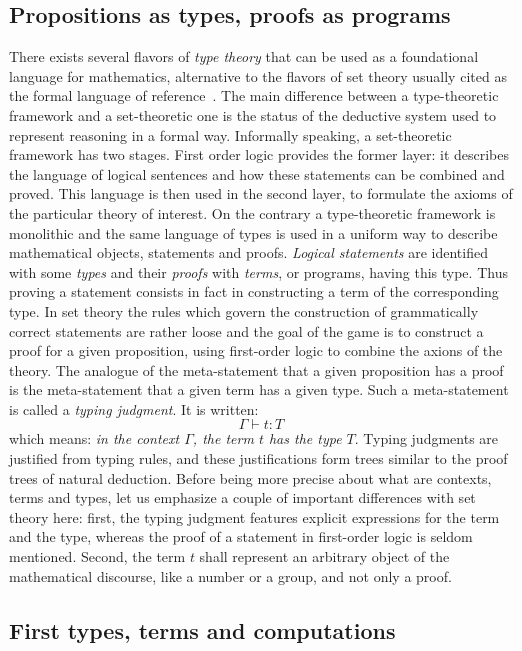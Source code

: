 \subsection{Propositions as types, proofs as programs}
There exists several flavors of \emph{type theory} that can be used
as a foundational language for mathematics, alternative to the
flavors of set theory usually cited as the formal language of
reference~\cite{MR2102219}.
The main difference between a type-theoretic framework and
a set-theoretic one is the status of the deductive system used to
represent reasoning in a formal way. Informally speaking, a
set-theoretic framework has two stages. First order logic provides
the former layer: it describes the language of logical sentences and how
these statements can be combined and proved. This language is then
used in the second layer, to formulate the axioms of the particular
theory of interest. 
On the contrary a type-theoretic framework is monolithic and the
same language of types is used in a uniform way to describe
mathematical objects, statements and proofs. \emph{Logical statements}
are identified with some \emph{types} and their \emph{proofs} with
\emph{terms}, or programs, having this type. Thus proving a statement
consists in fact in constructing a term of the corresponding type. In 
set theory the rules which govern the construction of
grammatically correct statements are rather loose and the goal of the
game is to construct a proof for a given proposition, using
first-order logic to combine the axions of the theory. 
The analogue of the meta-statement that a given
proposition has a proof is the meta-statement that a given term has a
given type. Such a meta-statement is called a \emph{typing
  judgment}. It is written:
$$\Gamma \vdash t : T$$
which means:
\emph{in the context $\Gamma$, the term $t$ has the type $T$}.
Typing judgments are justified from typing rules, and these
justifications form trees similar to the proof trees of natural deduction.
Before being more precise about what are contexts, terms and types,
let us emphasize a couple of important differences with set theory
here: first, the typing judgment features explicit expressions for
the term and the type, whereas the proof of a statement in first-order
logic is seldom mentioned. Second, the term $t$ shall represent an
arbitrary object of the mathematical discourse, like a number or a
group, and not only a proof.


\subsection{First types, terms and computations}\label{ssec:terms}

